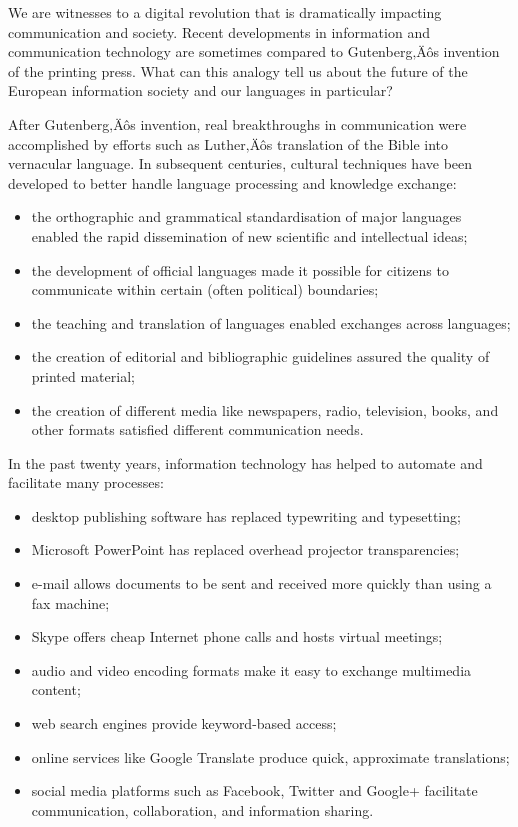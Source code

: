 \begin{multicols}{2}

We are witnesses to a digital revolution that is dramatically impacting communication and society. Recent developments in information and communication technology are sometimes compared to Gutenberg‚Äôs invention of the printing press. What can this analogy tell us about the future of the European information society and our languages in particular?


After Gutenberg‚Äôs invention, real breakthroughs in communication were accomplished by efforts such as Luther‚Äôs translation of the Bible into vernacular language. In subsequent centuries, cultural techniques have been developed to better handle language processing and knowledge exchange:

\begin{itemize}
\item the orthographic and grammatical standardisation of major languages enabled the rapid dissemination of new scientific and intellectual ideas;
\item the development of official languages made it possible for citizens to communicate within certain (often political) boundaries;
\item the teaching and translation of languages enabled exchanges across languages;
\item the creation of editorial and bibliographic guidelines assured the quality of printed material;
\item the creation of different media like newspapers, radio, television, books, and other formats satisfied different communication needs. 
\end{itemize}

In the past twenty years, information technology has helped to automate and facilitate many processes:

\begin{itemize}
\item desktop publishing software has replaced typewriting and typesetting;
\item Microsoft PowerPoint has replaced overhead projector transparencies;
\item e-mail allows documents to be sent and received more quickly than using a fax machine;
\item Skype offers cheap Internet phone calls and hosts virtual meetings;
\item audio and video encoding formats make it easy to exchange multimedia content;
\item web search engines provide keyword-based access;
\item online services like Google Translate produce quick, approximate translations;
\item social media platforms such as Facebook, Twitter and Google+ facilitate communication, collaboration, and information sharing.
\end{itemize}


\end{multicols}
